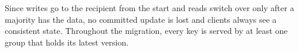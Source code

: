 Since writes go to the recipient from the start and reads switch over only after a majority has the data, no committed update is lost and clients always see a consistent state.
Throughout the migration, every key is served by at least one group that holds its latest version.
\fi







